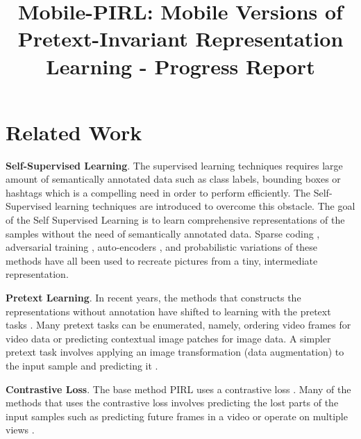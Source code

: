 \documentclass[conference]{IEEEtran}
\begin{document}
\title{Mobile-PIRL: Mobile Versions of Pretext-Invariant
Representation Learning - Progress Report\\
}

\author{
\and
{}
}

\maketitle


\section{Related Work}
\textbf{Self-Supervised Learning}. The supervised learning techniques requires large amount of semantically annotated data such as class labels, bounding boxes or hashtags which is a compelling need in order to perform efficiently. The Self-Supervised learning techniques are introduced to overcome this obstacle. The goal of the Self Supervised Learning is to learn comprehensive representations of the samples without the need of semantically annotated data. Sparse coding \cite{50}, adversarial training \cite{11}, auto-encoders \cite{Masci11stackedconvolutional}, and probabilistic variations of these methods \cite{59} have all been used to recreate pictures from a tiny, intermediate representation. 

\textbf{Pretext Learning}. In recent years, the methods that constructs the representations without annotation have shifted to learning with the pretext tasks \cite{9}. Many pretext tasks can be enumerated, namely, ordering video frames \cite{pirl1} for video data or predicting contextual image patches \cite{pirl9} for image data. A simpler pretext task involves applying an image transformation (data augmentation) to the input sample and predicting it \cite{pirl76}. 

\textbf{Contrastive Loss}. The base method PIRL uses a contrastive loss \cite{pirl22}. Many of the methods that uses the contrastive loss involves predicting the  lost parts of the input samples such as predicting future frames in a video \cite{pirl23} or operate on multiple views \cite{pirl64}. 
\end{document}
